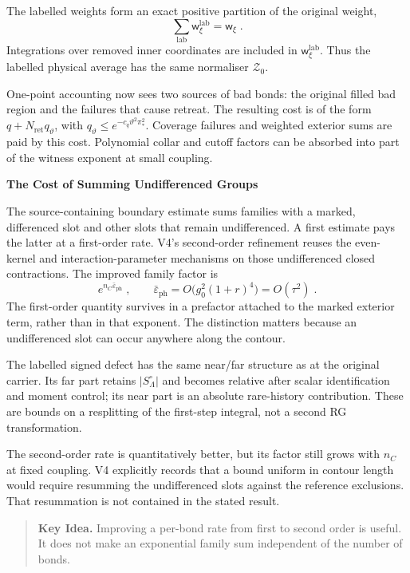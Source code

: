 \documentclass[11pt,a4paper]{article}
\newcommand{\subhead}[1]{\par\vspace{4pt}\textbf{\color{ink}#1}\par}
\newcommand{\idea}[1]{\begin{quote}\small\textbf{Key Idea.} #1\end{quote}}
\begin{document}
The labelled weights form an exact positive partition of the original weight,
\begin{equation*}
    \sum_{\mathrm{lab}}\mathsf w^{\mathrm{lab}}_\xi
        =\mathsf w_\xi\;.
\end{equation*}
Integrations over removed inner coordinates are included in $\mathsf w^{\mathrm{lab}}_\xi$. Thus the labelled physical average has the same normaliser $\mathcal Z_0$.

One-point accounting now sees two sources of bad bonds: the original filled bad region and the failures that cause retreat. The resulting cost is of the form $q+N_{\mathrm{ret}}q_\vartheta$, with $q_\vartheta\leqslant  e^{-c_q\vartheta^2\pi_*^2}$. Coverage failures and weighted exterior sums are paid by this cost. Polynomial collar and cutoff factors can be absorbed into part of the witness exponent at small coupling.

\subhead{The Cost of Summing Undifferenced Groups}
The source-containing boundary estimate sums families with a marked, differenced slot and other slots that remain undifferenced. A first estimate pays the latter at a first-order rate. V4's second-order refinement reuses the even-kernel and interaction-parameter mechanisms on those undifferenced closed contractions. The improved family factor is
\begin{equation*}
    e^{n_C\bar\varepsilon_{\mathrm{ph}}}\;,
    \qquad
    \bar\varepsilon_{\mathrm{ph}}
        =O\bigl(g_0^2(1+r)^4\bigr)=O(\tau^2)\;.
\end{equation*}
The first-order quantity survives in a prefactor attached to the marked exterior term, rather than in that exponent. The distinction matters because an undifferenced slot can occur anywhere along the contour.

The labelled signed defect has the same near/far structure as at the original carrier. Its far part retains $|S^\circ_\Lambda|$ and becomes relative after scalar identification and moment control; its near part is an absolute rare-history contribution. These are bounds on a resplitting of the first-step integral, not a second RG transformation.

The second-order rate is quantitatively better, but its factor still grows with $n_C$ at fixed coupling. V4 explicitly records that a bound uniform in contour length would require resumming the undifferenced slots against the reference exclusions. That resummation is not contained in the stated result.

\idea{Improving a per-bond rate from first to second order is useful. It does not make an exponential family sum independent of the number of bonds.}
\end{document}
